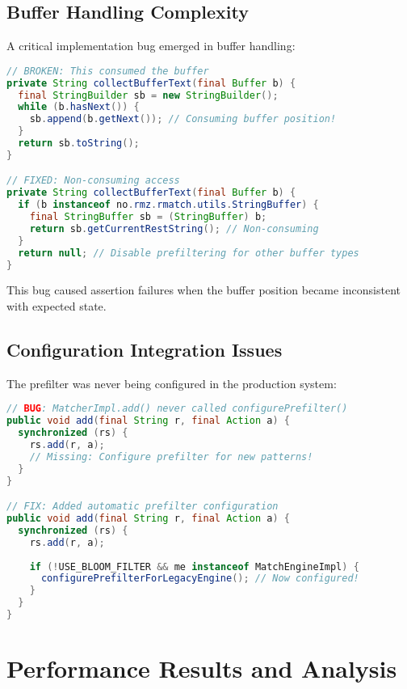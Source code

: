 \documentclass[11pt,a4paper]{article}
\begin{document}
\subsection{Buffer Handling Complexity}

A critical implementation bug emerged in buffer handling:

\begin{lstlisting}[language=Java, caption=Buffer consumption bug fix]
// BROKEN: This consumed the buffer
private String collectBufferText(final Buffer b) {
  final StringBuilder sb = new StringBuilder();
  while (b.hasNext()) {
    sb.append(b.getNext()); // Consuming buffer position!
  }
  return sb.toString();
}

// FIXED: Non-consuming access
private String collectBufferText(final Buffer b) {
  if (b instanceof no.rmz.rmatch.utils.StringBuffer) {
    final StringBuffer sb = (StringBuffer) b;
    return sb.getCurrentRestString(); // Non-consuming
  }
  return null; // Disable prefiltering for other buffer types
}
\end{lstlisting}

This bug caused assertion failures when the buffer position became inconsistent with expected state.

\subsection{Configuration Integration Issues}

The prefilter was never being configured in the production system:

\begin{lstlisting}[language=Java, caption=Missing configuration integration]
// BUG: MatcherImpl.add() never called configurePrefilter()
public void add(final String r, final Action a) {
  synchronized (rs) {
    rs.add(r, a);
    // Missing: Configure prefilter for new patterns!
  }
}

// FIX: Added automatic prefilter configuration
public void add(final String r, final Action a) {
  synchronized (rs) {
    rs.add(r, a);
    
    if (!USE_BLOOM_FILTER && me instanceof MatchEngineImpl) {
      configurePrefilterForLegacyEngine(); // Now configured!
    }
  }
}
\end{lstlisting}

\section{Performance Results and Analysis}
\end{document}
